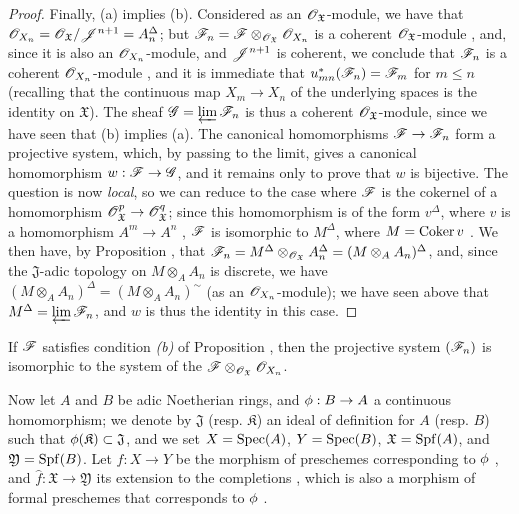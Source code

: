 \begin{proof}
Finally, (a) implies (b).
Considered as an $\mathscr{O}_\mathfrak{X}$-module, we have that $\mathscr{O}_{X_n}=\mathscr{O}_\mathfrak{X}/\mathscr{J}^{n+1}=A_n^\Delta$; but $\mathscr{F}_n=\mathscr{F}\otimes_{\mathscr{O}_\mathfrak{X}}\mathscr{O}_{X_n}$ is a coherent $\mathscr{O}_\mathfrak{X}$-module , and, since it is also an $\mathscr{O}_{X_n}$-module, and $\mathscr{J}^{n+1}$ is coherent, we conclude that $\mathscr{F}_n$ is a coherent $\mathscr{O}_{X_n}$-module , and it is immediate that $u_{mn}^*(\mathscr{F}_n)=\mathscr{F}_m$ for $m\leq n$ (recalling that the continuous map $X_m\to X_n$ of the underlying spaces is the identity on $\mathfrak{X}$).
The sheaf $\mathscr{G}=\varprojlim\mathscr{F}_n$ is thus a coherent $\mathscr{O}_\mathfrak{X}$-module, since we have seen that (b) implies (a). The canonical homomorphisms $\sh{F}\to\sh{F}_n$ form a projective system, which, by passing to the limit, gives a canonical homomorphism $w:\sh{F}\to\sh{G}$, and it remains only to prove that $w$ is bijective.
The question is now \emph{local}, so we can reduce to the case where $\mathscr{F}$ is the cokernel of a homomorphism $\sh{O}_\mathfrak{X}^p\to\sh{O}_\mathfrak{X}^q$; since this homomorphism is of the form $v^\Delta$, where $v$ is a homomorphism $A^m\to A^n$ , $\mathscr{F}$ is isomorphic to $M^\Delta$, where $M=\operatorname{Coker}{v}$ .
We then have, by Proposition , that $\mathscr{F}_n=M^\Delta\otimes_{\mathscr{O}_\mathfrak{X}}A_n^\Delta=(M\otimes_A A_n)^\Delta$, and, since the $\mathfrak{J}$-adic topology on $M\otimes_A A_n$ is discrete, we have $(M\otimes_A A_n)^\Delta=(M\otimes_A A_n)^\sim$ (as an $\mathscr{O}_{X_n}$-module); we have seen above that $M^\Delta=\varprojlim\mathscr{F}_n$, and $w$ is thus the identity in this case.
\end{proof}

\begin{corollary}[10.10.6]
\label{1.10.10.6}
If $\mathscr{F}$ satisfies condition \emph{(b)} of Proposition , then the projective system $(\mathscr{F}_n)$ is isomorphic to the system of the $\mathscr{F}\otimes_{\mathscr{O}_\mathfrak{X}}\mathscr{O}_{X_n}$.
\end{corollary}

\begin{env}[10.10.7]
\label{1.10.10.7}
Now let $A$ and $B$ be adic Noetherian rings, and $\vphi:B\to A$ a continuous homomorphism; we denote by $\mathfrak{J}$ (resp. $\mathfrak{K}$) an ideal of definition for $A$ (resp. $B$) such that $\phi(\mathfrak{K})\subset\mathfrak{J}$, and we set $X=\operatorname{Spec}(A)$, $Y=\operatorname{Spec}(B)$, $\mathfrak{X}=\operatorname{Spf}(A)$, and $\mathfrak{Y}=\operatorname{Spf}(B)$.
Let $f:X\to Y$ be the morphism of preschemes corresponding to $\phi$ , and $\widehat{f}:\mathfrak{X}\to\mathfrak{Y}$ its extension to the completions , which is also a morphism of formal preschemes that corresponds to $\phi$ .
\end{env}

